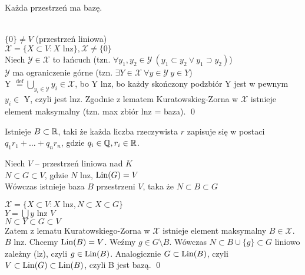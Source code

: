 \begin{tw} Każda przestrzeń ma bazę. \end{tw}

\begin{dd}
    ~\\
    $ \{0\} \neq V $ (przestrzeń liniowa) \\
    $ \mathcal{X} = \{ X \subset V : X \text{ lnz} \}, \mathcal{X}  \neq \{0\}$ \\
    Niech $\mathcal{Y} \in \mathcal{X} $ to łańcuch (tzn. $\forall y_1, y_2 \in \mathcal{Y} \ (y_1 \subset y_2 \lor y_1 \supset y_2)$) \\
    $\mathcal{Y}$ ma ograniczenie górne (tzn. $\exists Y \in \mathcal{X} \ \forall y \in \mathcal{Y} \ y \in Y$) \\
    Y $\overset{\mathrm{def}}{=} \bigcup\limits_{y_i \in \mathcal{Y}} y_i \in \mathcal{X}$, bo Y lnz, bo każdy skończony podzbiór Y jest w pewnym $y_i \in $ Y, czyli jest lnz.
    Zgodnie z lematem Kuratowskieg-Zorna w $\mathcal{X}$ istnieje element maksymalny (tzn. max zbiór lnz = baza). \qed
\end{dd}

\begin{prz}
    Istnieje $ B \subset \mathbb{R} $, taki że każda liczba rzeczywista $ r $ zapisuje się w postaci
    $ q_1r_1 + \dots + q_nr_n $, gdzie $ q_i \in \mathbb{Q}, r_i \in \mathbb{R} $.
\end{prz}

\begin{tw}
    Niech $ V $ -- przestrzeń liniowa nad $ K $\\
    $ N \subset G \subset V$, gdzie $ N $ lnz, $\operatorname{Lin}(G) = V$\\
    Wówczas istnieje baza $ B $ przestrzeni $ V $, taka że $ N \subset B \subset G $
\end{tw}

\begin{dd}
    $ \mathcal{X} = \{ X \subset V : X \text{ lnz} , N \subset X \subset G\}$ \\
    $ Y = \bigcup y \text{ lnz } V$ \\
    $ N \subset Y \subset G \subset V $ \\
    Zatem z lematu Kuratowskiego-Zorna w $\mathcal{X} $ istnieje element maksymalny  $B \in \mathcal{X}.$
    $B$ lnz. Chcemy $\operatorname{Lin}(B) = V$. Weźmy $g \in G \setminus B.$ Wówczas $N \subset B \cup \{g\} \subset G $ liniowo zależny (lz), czyli $g \in \operatorname{Lin}(B)$. Analogicznie $G \subset \operatorname{Lin}(B)$, czyli $V \subset \operatorname{Lin}(G) \subset \operatorname{Lin}(B)$, czyli B jest bazą. \qed
\end{dd}

